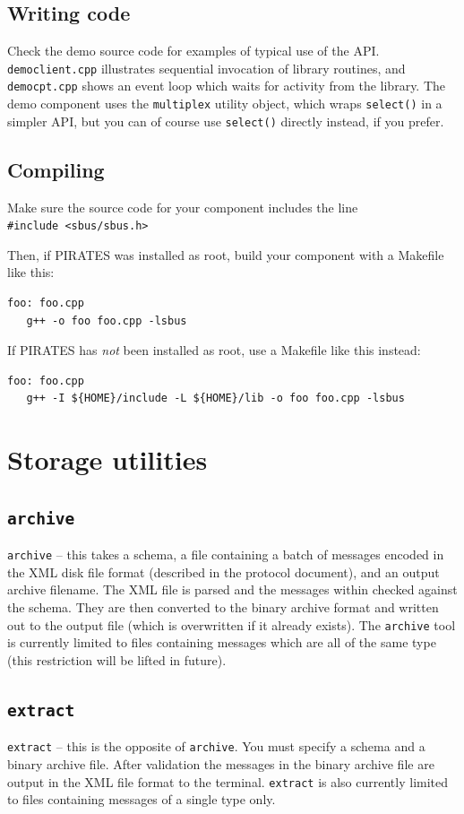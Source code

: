 \documentclass[12pt,a4paper,twoside]{article}
\renewcommand{\_}{\texttt{\symbol{95}}}
\begin{document}
\subsection{Writing code}

Check the demo source code for examples of typical use of the API.
\verb^democlient.cpp^ illustrates sequential invocation of library
routines, and \verb^democpt.cpp^ shows an event loop which waits for
activity from the library. The demo component uses the \verb^multiplex^
utility object, which wraps \verb^select()^ in a simpler API, but you
can of course use \verb^select()^ directly instead, if you prefer.

\subsection{Compiling}

Make sure the source code for your component includes the line\\
\verb^#include <sbus/sbus.h>^

Then, if PIRATES was installed as root, build your component with a Makefile
like this:
\begin{verbatim}
foo: foo.cpp
   g++ -o foo foo.cpp -lsbus
\end{verbatim}

If PIRATES has \textit{not} been installed as root,
use a Makefile like this instead:
\begin{verbatim}
foo: foo.cpp
   g++ -I ${HOME}/include -L ${HOME}/lib -o foo foo.cpp -lsbus
\end{verbatim}

\section{Storage utilities}

\subsection{\texttt{archive}}

\verb^archive^ -- this takes a schema, a file containing a batch
of messages encoded in the XML disk file format (described in the
protocol document), and an output archive filename. The XML file is
parsed and the messages within checked against the schema. They
are then converted to the binary archive format and written out to the
output file (which is overwritten if it already exists). The
\verb^archive^ tool is currently limited to files containing
messages which are all of the same type (this restriction will
be lifted in future).

\subsection{\texttt{extract}}

\verb^extract^ -- this is the opposite of \verb^archive^. You
must specify a schema and a binary archive file. After validation
the messages in the binary archive file are output in the XML
file format to the terminal. \verb^extract^ is also currently
limited to files containing messages of a single type only.
\end{document}
